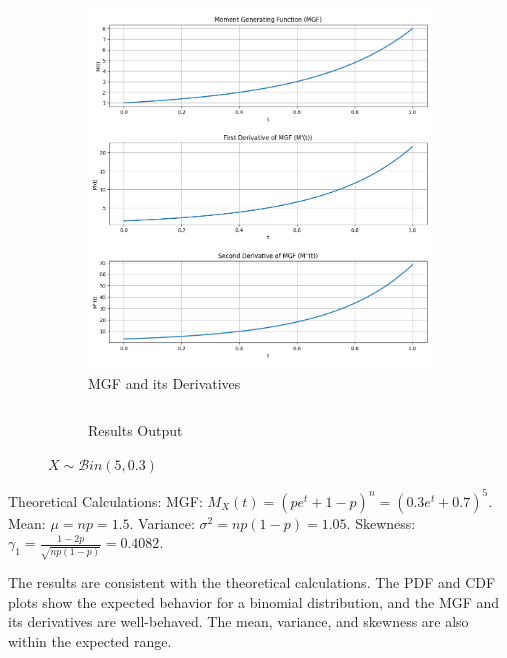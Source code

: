 \documentclass{article}
\begin{document}
\begin{figure}[H]
\begin{subfigure}{0.45\textwidth}
    \includegraphics[width=\linewidth]{results/section1/d1(2).png}
    \caption{MGF and its Derivatives}
  \end{subfigure}
  \begin{subfigure}{\textwidth}
    \inputminted{text}{results/section1/d1.txt}
    \caption{Results Output}
  \end{subfigure}
  \caption{$X\sim \mathcal{B}in(5, 0.3)$}
\end{figure}

Theoretical Calculations:
MGF: $M_X(t) = (pe^t+1-p)^n=(0.3e^t+0.7)^5$.
Mean: $\mu = np=1.5$.
Variance: $\sigma^2 = np(1-p)=1.05$.
Skewness: $\gamma_1 = \frac{1-2p}{\sqrt{np(1-p)}}=0.4082$.

The results are consistent with the theoretical calculations. The PDF and CDF plots show the expected behavior for a binomial distribution, and the MGF and its derivatives are well-behaved. The mean, variance, and skewness are also within the expected range.

\newpage
\end{document}
